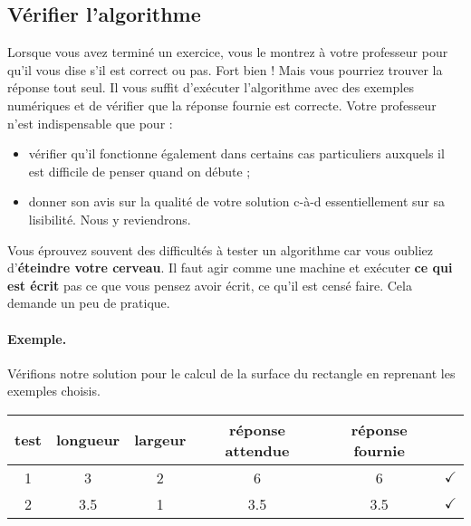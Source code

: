 		\subsection{Vérifier l'algorithme}
		
			Lorsque vous avez terminé un exercice,
			vous le montrez à votre professeur pour qu'il
			vous dise s'il est correct ou pas.
			Fort bien !
			Mais vous pourriez trouver la réponse tout seul.
			Il vous suffit d'exécuter l'algorithme
			avec des exemples numériques et de vérifier que la réponse
			fournie est correcte.
			Votre professeur n'est indispensable que pour :
			\begin{itemize}
			\item
				vérifier qu'il fonctionne également
				dans certains cas particuliers
				auxquels il est difficile de penser quand on débute ;
			\item
				donner son avis sur la qualité de votre solution
				c-à-d essentiellement sur sa lisibilité.
				Nous y reviendrons.
			\end{itemize}
		
			Vous éprouvez souvent des difficultés à tester un algorithme
			car vous oubliez d'\textbf{éteindre votre cerveau}.
			Il faut agir comme une machine
			et exécuter \textbf{ce qui est écrit} 
			pas ce que vous pensez avoir écrit,
			ce qu'il est censé faire.
			Cela demande un peu de pratique.

			\begin{Emphase}
				\paragraph{Exemple.} 
				Vérifions notre solution 
				pour le calcul de la surface du rectangle
				en reprenant les exemples choisis.
				
				\begin{center}
				\begin{tabular}{|c|cccc|c|}
				\hline
				test \no & longueur & largeur & réponse attendue & réponse fournie & {} \\\hline
				\hline 
				1 & 3   & 2 & 6   & 6   & {\color{ForestGreen}$\checkmark$} \\\hline
				2 & 3.5 & 1 & 3.5 & 3.5 & {\color{ForestGreen}$\checkmark$} \\\hline
				\end{tabular}
				\end{center}				
			\end{Emphase}
			
